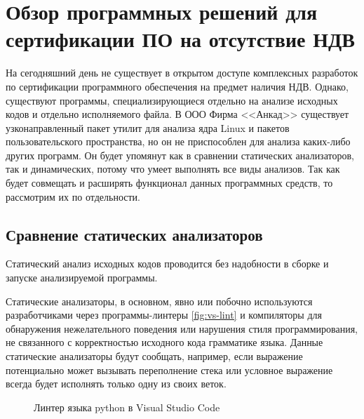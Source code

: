 \section{Обзор программных решений для сертификации ПО на отсутствие НДВ}\label{sec:ch1/sec3}
На сегодняшний день не существует в открытом доступе комплексных разработок по сертификации программного 
обеспечения на предмет наличия НДВ.
Однако, существуют программы, специализирующиеся отдельно на анализе исходных кодов
и отдельно исполняемого файла. В ООО Фирма <<Анкад>> существует узконаправленный пакет утилит для анализа ядра 
Linux и пакетов пользовательского пространства, но он не приспособлен для анализа каких-либо других программ. Он будет 
упомянут как в сравнении статических анализаторов, так и динамических, потому что умеет выполнять все виды анализов.
Так как {\ProgModule} будет совмещать и расширять функционал
данных программных средств, то рассмотрим их по отдельности.

\subsection{Сравнение статических анализаторов}\label{sec:ch1/sec3/sub1}
Статический анализ исходных кодов проводится без надобности в сборке и запуске 
анализируемой программы. 

Статические анализаторы, в основном, явно или побочно используются разработчиками через программы-линтеры \autoref{fig:vs-lint} и компиляторы
для обнаружения нежелательного поведения или нарушения стиля программирования, не связанного с корректностью
исходного кода грамматике языка. 
Данные статические анализаторы будут сообщать, например, если выражение потенциально
может вызывать переполнение стека или условное выражение всегда будет исполнять только одну
из своих веток.

\begin{figure}[!htbp]
    \caption{Линтер языка python в Visual Studio Code\label{fig:vs-lint}}
\end{figure}

